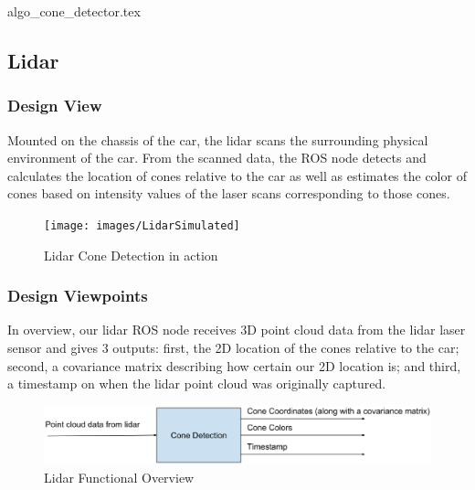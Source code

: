 \documentclass[10pt, onecolumn, draftclsnofoot, letterpaper,compsoc]{IEEEtran}
\begin{document}
\begin{algorithm}[H]
\caption{Cone Detector}
\label{alg:cameraConeDetector}
\begin{algorithmic}[1]
{algo_cone_detector.tex}
\end{algorithmic}
\end{algorithm}


\newpage

\subsection{Lidar}
\subsubsection{Design View} %
Mounted on the chassis of the car, the lidar scans the surrounding physical environment of the car. From the scanned data, the ROS node detects and calculates the location of cones relative to the car as well as estimates the color of cones based on intensity values of the laser scans corresponding to those cones.

\begin{figure}[htbp]
\centering
\label{fig:LidarInterfaceOverview}
\caption{Lidar Cone Detection in action}
\texttt{[image: images/LidarSimulated]}
\end{figure}

\subsubsection{Design Viewpoints} %
In overview, our lidar ROS node receives 3D point cloud data from the lidar laser sensor and gives 3 outputs: first, the 2D location of the cones relative to the car; second, a covariance matrix describing how certain our 2D location is; and third, a timestamp on when the lidar point cloud was originally captured. 

\begin{figure}[htbp]
\centering
\label{fig:LidarInterfaceOverview}
\caption{Lidar Functional Overview}
\includegraphics[width=15cm]{images/LidarInterfaceOverview}
\end{figure}
\end{document}

